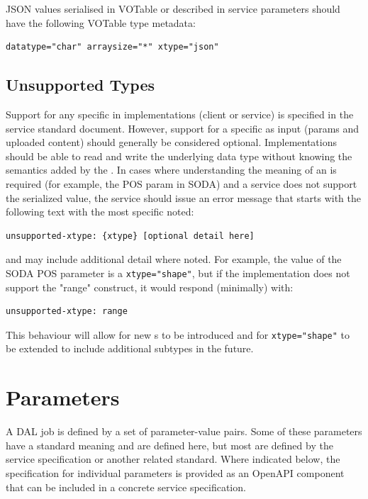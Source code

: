 \documentclass[11pt,letter]{ivoa}
\begin{document}
JSON values serialised in VOTable or described in service parameters should have
the following VOTable type metadata:

\begin{verbatim}
datatype="char" arraysize="*" xtype="json"
\end{verbatim}

\subsection{Unsupported Types}

Support for any specific  in implementations (client or service) is specified in
the service standard document. However, support for a specific  as input (params
and uploaded content) should generally be considered optional. Implementations should
be able to read and write the underlying data type without knowing the semantics added
by the . In cases where understanding the meaning of an  is required (for
example, the POS param in SODA) and a service does not support the serialized value,
the service should issue an error message that starts with the following text with the
most specific  noted:
\begin{verbatim}
unsupported-xtype: {xtype} [optional detail here]
\end{verbatim}
and may include additional detail where noted. For example, the value of the SODA POS parameter
is a \verb|xtype="shape"|, but if the implementation does not support the "range" construct, it
would respond (minimally) with:
\begin{verbatim}
unsupported-xtype: range
\end{verbatim}
This behaviour will allow for new s to be introduced and for \verb|xtype="shape"|
to be extended to include additional subtypes in the future.

\section{Parameters}
\label{sec:parameters}
A DAL job is defined by a set of parameter-value pairs. Some of these parameters
have a standard meaning and are defined here, but most are defined by the
service specification or another related standard. Where indicated below, the
specification for individual parameters is provided as an OpenAPI
\citep{openapi2021spec31} component that can be included in a concrete service
specification.
\end{document}
